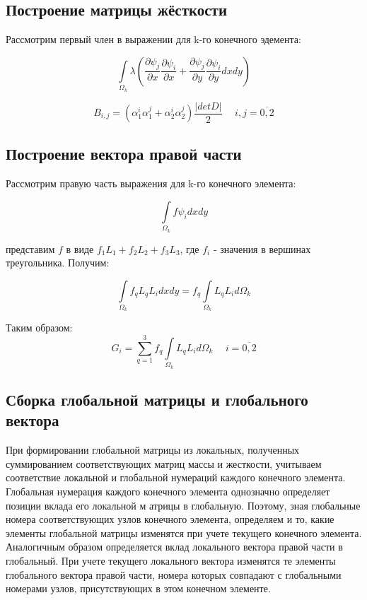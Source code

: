 \documentclass[12pt,a4paper]{article}
\begin{document}
\subsection*{Построение матрицы жёсткости}

Рассмотрим первый член в выражении для k-го конечного
эдемента:

$$
\int \limits_{\Omega_k} \lambda
    \left(
        \frac{\partial \psi_j}{\partial x}
        \frac{\partial \psi_i}{\partial x}
        +
        \frac{\partial \psi_j}{\partial y}
        \frac{\partial \psi_i}{\partial y}
        dxdy
    \right)
$$

$$
B_{i,j}=(\alpha_1^i \alpha_1^j + \alpha_2^i \alpha_2^j)
    \frac{\big \vert det D \big \vert}{2}
    \hspace{15pt} i,j=\overline{0,2}
$$

\subsection*{Построение вектора правой части}

Рассмотрим правую часть выражения для k-го конечного элемента:

$$
\int \limits_{\Omega_k} f \psi_i dxdy
$$

\noindent представим $f$ в виде $f_1 L_1 + f_2 L_2 + f_3 L_3$, где
$f_i$ - значения в вершинах треугольника. Получим:

$$
\int \limits_{\Omega_k} f_q L_q L_i dxdy =
    f_q \int \limits_{\Omega_k} L_q L_i d \Omega_k
$$

\noindent Таким образом:
$$
G_i = \sum \limits_{q=1}^{3}
    f_q \int \limits_{\Omega_k} L_q L_i d\Omega_k
    \hspace{15pt} i=\overline{0,2}
$$

\subsection*{Сборка глобальной матрицы и глобального вектора}

При формировании глобальной матрицы из локальных,
полученных суммированием соответствующих матриц
массы и жесткости, учитываем соответствие локальной
и глобальной нумераций каждого конечного элемента.
Глобальная нумерация каждого конечного элемента
однозначно определяет позиции вклада его локальной м
атрицы в глобальную. Поэтому, зная глобальные
номера соответствующих узлов конечного элемента,
определяем и то, какие элементы глобальной матрицы
изменятся при учете текущего конечного элемента.
Аналогичным образом определяется вклад локального
вектора правой части в глобальный. При учете
текущего локального вектора изменятся те элементы
глобального вектора правой части, номера которых
совпадают с глобальными номерами узлов, присутствующих
в этом конечном элементе.
\end{document}
